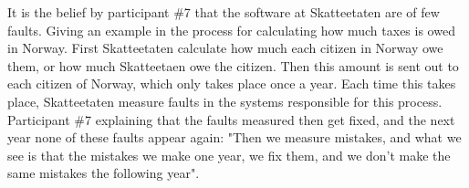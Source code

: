 
It is the belief by participant \#7 that the software at Skatteetaten are of few faults. Giving an example in the process for calculating how much taxes is owed in Norway. First Skatteetaten calculate how much each citizen in Norway owe them, or how much Skatteetaen owe the citizen. Then this amount is sent out to each citizen of Norway, which only takes place once a year. Each time this takes place, Skatteetaten measure faults in the systems responsible for this process. Participant \#7 explaining that the faults measured then get fixed, and the next year none of these faults appear again: "Then we measure mistakes, and what we see is that the mistakes we make one year, we fix them, and we don't make the same mistakes the following year".




